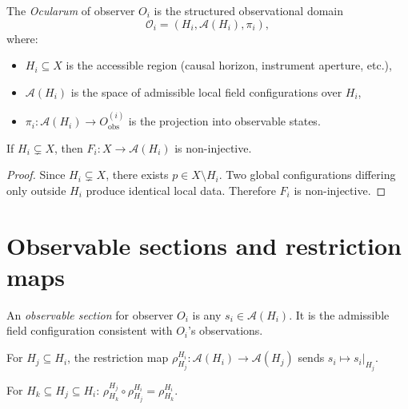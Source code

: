 \begin{definition}[Ocularum]
  \label{def:ocularum-formal}
  The \emph{Ocularum} of observer $O_i$ is the structured
  observational domain
  \[
    \mathcal{O}_i = (H_i, \mathcal{A}(H_i), \pi_i),
  \]
  where:
  \begin{itemize}[leftmargin=2em]
    \item $H_i \subseteq X$ is the accessible region
      (causal horizon, instrument aperture, etc.),
    \item $\mathcal{A}(H_i)$ is the space of admissible local
      field configurations over $H_i$,
    \item $\pi_i : \mathcal{A}(H_i) \to O_{\mathrm{obs}}^{(i)}$
      is the projection into observable states.
  \end{itemize}
\end{definition}

\begin{proposition}
  \label{prop:horizon-projection}
  \statusproven{}
  If $H_i \subsetneq X$, then $F_i : X \to \mathcal{A}(H_i)$
  is non-injective.
\end{proposition}

\begin{proof}
  Since $H_i \subsetneq X$, there exists $p \in X \setminus H_i$.
  Two global configurations differing only outside $H_i$ produce
  identical local data.
  Therefore $F_i$ is non-injective.
\end{proof}

\section{Observable sections and restriction maps}

\begin{definition}
  An \emph{observable section} for observer $O_i$ is any
  $s_i \in \mathcal{A}(H_i)$.
  It is the admissible field configuration consistent with
  $O_i$'s observations.
\end{definition}

\begin{definition}
  For $H_j \subseteq H_i$, the restriction map
  $\rho^{H_i}_{H_j} : \mathcal{A}(H_i) \to \mathcal{A}(H_j)$
  sends $s_i \mapsto s_i|_{H_j}$.
\end{definition}

\begin{proposition}
  \label{prop:restriction-compose}
  \statusproven{}
  For $H_k \subseteq H_j \subseteq H_i$:
  $\rho^{H_j}_{H_k} \circ \rho^{H_i}_{H_j} = \rho^{H_i}_{H_k}$.
\end{proposition}

